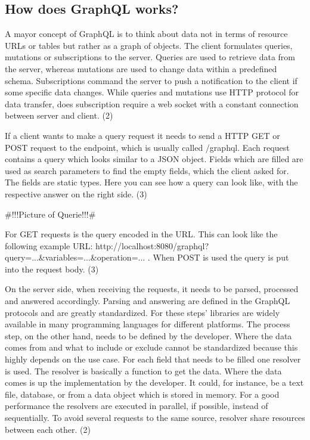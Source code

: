 \documentclass[conference]{IEEEtran}
\begin{document}
\subsection{How does GraphQL works?}\label{graphql}

A mayor concept of GraphQL is to think about data not in terms of resource URLs or tables but rather as a graph of objects. The client formulates queries, mutations or subscriptions to the server. Queries are used to retrieve data from the server, whereas mutations are used to change data within a predefined schema. Subscriptions command the server to push a notification to the client if some specific data changes. While queries and mutations use HTTP protocol for data transfer, does subscription require a web socket with a constant connection between server and client. (2)

If a client wants to make a query request it needs to send a HTTP GET or POST request to the endpoint, which is usually called /graphql. Each request contains a query which looks similar to a JSON object. Fields which are filled are used as search parameters to find the empty fields, which the client asked for. The fields are static types. Here you can see how a query can look like, with the respective answer on the right side. (3)
 
 #!!!Picture of Querie!!!#
 
For GET requests is the query encoded in the URL. This can look like the following example URL: http://localhost:8080/graphql?query={...}&variables={...}&operation=... . When POST is used the query is put into the request body. (3)

On the server side, when receiving the requests, it needs to be parsed, processed and answered accordingly. Parsing and answering are defined in the GraphQL protocols and are greatly standardized. For these steps’ libraries are widely available in many programming languages for different platforms. The process step, on the other hand, needs to be defined by the developer. Where the data comes from and what to include or exclude cannot be standardized because this highly depends on the use case. For each field that needs to be filled one resolver is used. The resolver is basically a function to get the data. Where the data comes is up the implementation by the developer. It could, for instance, be a text file, database, or from a data object which is stored in memory. For a good performance the resolvers are executed in parallel, if possible, instead of sequentially. To avoid several requests to the same source, resolver share resources between each other. (2)
\end{document}

